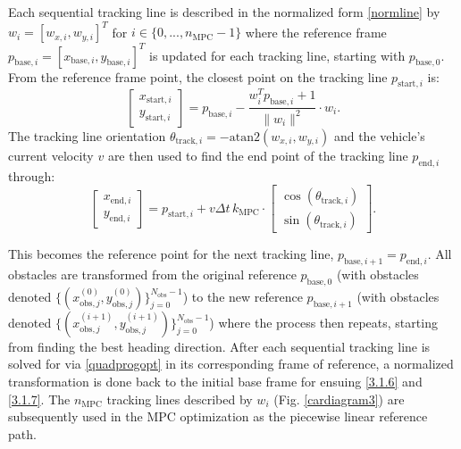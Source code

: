 \documentclass[journal]{IEEEtran}
\begin{document}
Each sequential tracking line is described in the normalized form \eqref{normline} by \mbox{$w_i=[w_{x,i},w_{y,i}]^T$} for \mbox{$i \in \{0,...,n_\text{MPC}-1\}$} where the reference frame \mbox{$p_{\text{base},i}=[x_{\text{base},i},y_{\text{base},i}]^T$} is updated for each tracking line, starting with $p_{\text{base},0}$. From the reference frame point, the closest point on the tracking line $p_{\text{start},i}$ is:
\begin{equation}
\begin{bmatrix}
    x_{\text{start},i}\\
    y_{\text{start},i}
\end{bmatrix}=p_{\text{base},i}-\frac{w_i^Tp_{\text{base},i}+1}{\|w_i\|^2}\cdot w_i.
    \label{3.1.6}
\end{equation}
The tracking line orientation \mbox{$\theta_{\text{track},i}=-\mathrm{atan2}({w_{x,i}},{w_{y,i}})$} and the vehicle's current velocity $v$ are then used to find the end point of the tracking line $p_{\text{end},i}$ through:
\begin{equation}
    \begin{bmatrix}
        x_{\text{end},i}\\
        y_{\text{end},i}
    \end{bmatrix}=p_{\text{start},i}+v\Delta t\,k_\text{MPC}\cdot \begin{bmatrix}
        \cos(\theta_{\text{track},i})\\
        \sin(\theta_{\text{track},i})
    \end{bmatrix}.
    \label{3.1.7}
\end{equation}

This becomes the reference point for the next tracking line, $p_{\text{base},i+1}=p_{\text{end},i}$. All obstacles are transformed from the original reference $p_{\text{base},0}$ (with obstacles denoted $\{{(x^{(0)}_{\text{obs},j}, y^{(0)}_{\text{obs},j})}\}_{j=0}^{N_{\text{obs}}-1}$)  to the new reference $p_{\text{base},i+1}$ (with obstacles denoted $\{{(x^{(i+1)}_{\text{obs},j}, y^{(i+1)}_{\text{obs},j})}\}_{j=0}^{N_{\text{obs}}-1}$) where the process then repeats, starting from finding the best heading direction. After each sequential tracking line is solved for via \eqref{quadprogopt} in its corresponding frame of reference, a normalized transformation is done back to the initial base frame for ensuing \eqref{3.1.6} and \eqref{3.1.7}. The $n_\text{MPC}$ tracking lines described by $w_i$ (Fig. \ref{cardiagram3}) are subsequently used in the MPC optimization as the piecewise linear reference path.
\end{document}
